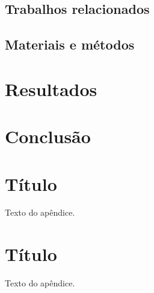 \documentclass[
    12pt,               %
    openright,          %
    oneside,            %
    a4paper,            %
    english,            %
    french,             %
    spanish,            %
    brazil              %
    ]{abntex2}
\begin{document}
\section{Trabalhos relacionados}

\section{Materiais e métodos}

\chapter{Resultados}



\chapter[Conclusão]{Conclusão}

\postextual



%
%


\begin{apendicesenv}

\partapendices

\chapter{Título}

Texto do apêndice.

\chapter{Título}

Texto do apêndice.

\end{apendicesenv}
\end{document}
